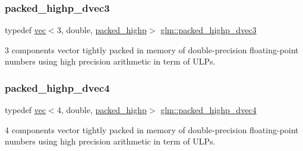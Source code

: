 \mbox{\label{group__gtc__type__aligned_ga46950596525c0d1983113ead5f676651}} 
\subsubsection{\texorpdfstring{packed\+\_\+highp\+\_\+dvec3}{packed\_highp\_dvec3}}
{\footnotesize\ttfamily typedef \hyperlink{structglm_1_1vec}{vec}$<$3, double, \hyperlink{namespaceglm_a36ed105b07c7746804d7fdc7cc90ff25a8e8791ee77fe079b1291f710d88031bf}{packed\+\_\+highp}$>$ \hyperlink{group__gtc__type__aligned_ga46950596525c0d1983113ead5f676651}{glm\+::packed\+\_\+highp\+\_\+dvec3}}



3 components vector tightly packed in memory of double-\/precision floating-\/point numbers using high precision arithmetic in term of U\+L\+Ps. 

\mbox{\label{group__gtc__type__aligned_ga7eb6a2440202876a3a223a1931dd496a}} 
\subsubsection{\texorpdfstring{packed\+\_\+highp\+\_\+dvec4}{packed\_highp\_dvec4}}
{\footnotesize\ttfamily typedef \hyperlink{structglm_1_1vec}{vec}$<$4, double, \hyperlink{namespaceglm_a36ed105b07c7746804d7fdc7cc90ff25a8e8791ee77fe079b1291f710d88031bf}{packed\+\_\+highp}$>$ \hyperlink{group__gtc__type__aligned_ga7eb6a2440202876a3a223a1931dd496a}{glm\+::packed\+\_\+highp\+\_\+dvec4}}



4 components vector tightly packed in memory of double-\/precision floating-\/point numbers using high precision arithmetic in term of U\+L\+Ps. 

\mbox{\label{group__gtc__type__aligned_ga7fde67656fb5726169114054992f0a3f}} 
